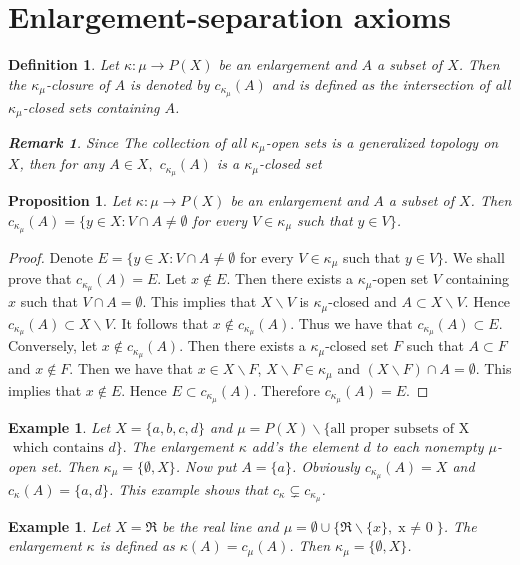 \documentclass{matua}
\newtheorem{definition}[theorem]{Definition}
\newtheorem{example}[theorem]{Example}
\newtheorem{proposition}[theorem]{Proposition}
\newtheorem{remark}[theorem]{Remark}
\begin{document}
\section{Enlargement-separation axioms}
\begin{definition}
Let $\kappa: \mu\rightarrow P(X)$ be an enlargement and $A$ a subset of $X$. Then the $\kappa_\mu$-closure of $A$ is denoted by $c_{\kappa_\mu}(A)$ and is defined as the intersection of all $\kappa_\mu$-closed sets containing $A$.
\begin{remark}
Since The collection of all $\kappa_\mu$-open sets is a generalized topology on $X$, then for any $A\in X,$ $c_{\kappa_\mu}(A)$ is a $\kappa_\mu$-closed set
\end{remark}
\end{definition}
\begin{proposition}\label{p3.11}
Let $\kappa: \mu\rightarrow P(X)$ be an enlargement and $A$ a subset of $X$. Then $c_{\kappa_\mu}(A)=\{y\in X: V\cap A\neq\emptyset$ for every $V\in \kappa_\mu$ such that $y\in V\}$.
\end{proposition}
\begin{proof}
Denote $E=\{y\in X: V\cap A\neq\emptyset$ for every $V\in \kappa_\mu$ such that $y\in V\}$. We shall prove that $c_{\kappa_\mu}(A)=E$. Let $x\notin E$. Then there exists a $\kappa_\mu$-open set $V$ containing $x$ such that $V\cap A=\emptyset$. This implies that $X\backslash V$ is $\kappa_\mu$-closed and $A\subset X\backslash V$. Hence $c_{\kappa_\mu}(A)\subset X\backslash V$. It follows that $x\notin c_{\kappa_\mu}(A)$. Thus we have that $c_{\kappa_\mu}(A)\subset E$. Conversely, let $x\notin c_{\kappa_\mu}(A)$. Then there exists a ${\kappa_\mu}$-closed set $F$ such that $A\subset F$ and $x\notin F$. Then we have that $x\in X\backslash F$, $X\backslash F\in {\kappa_\mu}$ and $(X\backslash F)\cap A=\emptyset$. This implies that $x\notin E$. Hence $E\subset c_{\kappa_\mu}(A)$. Therefore $c_{\kappa_\mu}(A)=E$.
\end{proof}
\begin{example}
Let $X=\{a,b,c,d\}$ and $\mu=P(X)\backslash\{\mbox{all proper subsets of X }$
$ \mbox{ which contains }d\}.$\linebreak 
The enlargement $\kappa$ add's the element $d$ to each nonempty $\mu$-open set. Then $\kappa_\mu = \{\emptyset, X\}$. Now put $A=\{a\}$. Obviously $c_{\kappa_\mu}(A)=X$ and $c_{\kappa}(A)=\{a,d\}$. This example shows that $c_{\kappa}\subsetneq c_{\kappa_\mu}$.
\end{example}
\begin{example}
Let $X=\Re$ be the real line and $\mu=\emptyset\cup\{\Re\backslash\{x\},\mbox{x $\neq$ 0}\}$.
The enlargement $\kappa$ is defined as $\kappa(A) = c_\mu(A)$. Then $\kappa_\mu = \{\emptyset, X\}$.
\end{example}
\end{document}
